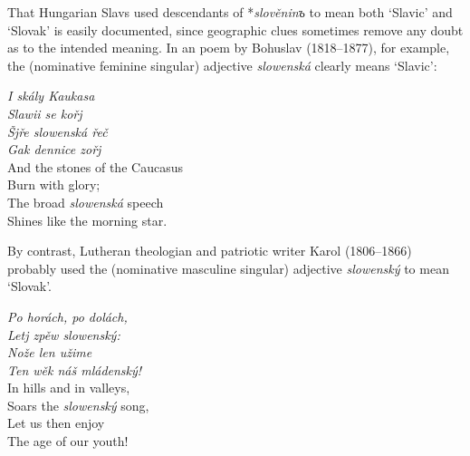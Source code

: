 That Hungarian Slavs used descendants of *\textit{slověninъ} to mean both ‘Slavic’ and ‘Slovak’ is easily documented, since geographic clues sometimes remove any doubt as to the intended meaning. In an \citeyear{nosak_slowenka_1842} poem by Bohuslav \citeauthor{nosak_slowenka_1842} (1818--1877), for example, the (nominative feminine singular) adjective \textit{slowenská} clearly means ‘Slavic’:

\begin{multicols}{2}
\noindent \hspace*{5mm} \textit{I skály Kaukasa} \\ 
\hspace*{5mm} \textit{Slawii se kořj} \\ 
\hspace*{5mm} \textit{Šjře slowenská řeč} \\ \columnbreak
\hspace*{5mm} \textit{Gak dennice zořj} \\
And the stones of the Caucasus \\
Burn with glory; \\
The broad \textit{slowenská} speech \\
Shines like the morning star. \smallskip \\
\citep[164]{nosak_slowenka_1842}
\end{multicols}

\noindent By contrast, Lutheran theologian and patriotic writer Karol \citeauthor{kuzmany_pjsen_1835} (1806--1866) probably used the (nominative masculine singular) adjective \textit{slowenský} to mean ‘Slovak’.

\begin{multicols}{2}
\noindent \hspace*{5mm} \textit{Po horách, po dolách,} \\
\hspace*{10mm} \textit{Letj zpěw slowenský:} \\
\hspace*{5mm} \textit{Nože len užime} \\ \columnbreak
\hspace*{10mm} \textit{Ten wěk náš mládenský!} \\
In hills and in valleys, \\
\hspace*{5mm} Soars the \textit{slowenský} song, \\
Let us then enjoy \\
\hspace*{5mm} The age of our youth! \smallskip \\
\citep[167]{kuzmany_pjsen_1835}
\end{multicols}

